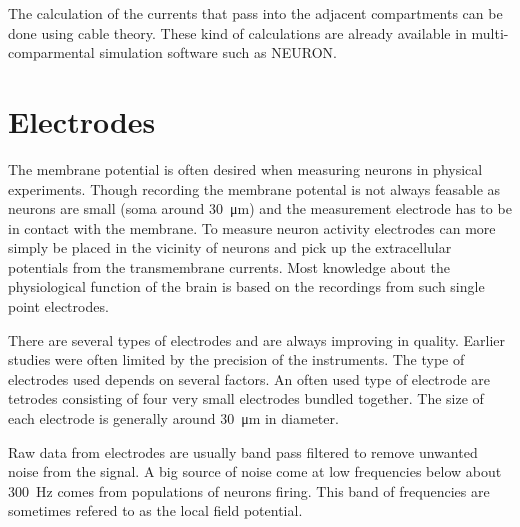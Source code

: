 \documentclass[altfont, fleqn]{uiophd}
\begin{document}
The calculation of the currents that pass into the adjacent compartments
can be done using cable theory. 
These kind of calculations are already available in multi-comparmental
simulation software such as NEURON. 

\section{Electrodes}
The membrane potential is often desired 
when measuring neurons in physical experiments. 
Though recording the membrane potental is not always feasable 
as neurons are small (soma around 
\SI{30}{\micro\metre}) and the measurement electrode
has to be in contact with the membrane. 
To measure neuron activity electrodes can more simply be placed
in the vicinity of neurons and pick up the extracellular
potentials from the transmembrane currents. 
Most knowledge about the physiological function of the brain is 
based on the recordings from such single point electrodes. 

There are several types of electrodes and are always improving
in quality. 
Earlier studies were often limited by the precision of the instruments. 
The type of electrodes used depends on several factors. 
An often used type of electrode are tetrodes consisting of 
four very small electrodes bundled together. 
The size of each electrode is generally around
\SI{30}{\micro\metre} in diameter. 

Raw data from electrodes are usually band pass
filtered to remove unwanted noise from the signal. 
A big source of noise come at low frequencies below about 
\SI{300}{\hertz}
comes from populations of neurons firing. 
This band of frequencies are sometimes refered to as the local field
potential. 

\end{document}
